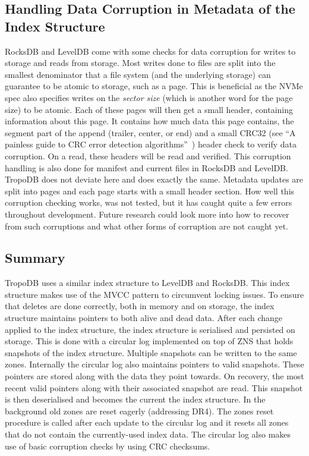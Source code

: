 \subsection{Handling Data Corruption in Metadata of the Index Structure}
RocksDB and LevelDB come with some checks for data corruption for writes to storage and reads from storage. Most writes done to files are split into the smallest denominator that a file system (and the underlying storage) can guarantee to be atomic to storage, such as a page. This is beneficial as the NVMe spec also specifies writes on the \textit{sector size} (which is another word for the page size) to be atomic. Each of these pages will then get a small header, containing information about this page. It contains how much data this page contains, the segment part of the append (trailer, center, or end) and a small CRC32 (see ``A painless guide to CRC error detection algorithms''~\cite{williams1993painless}) header check to verify data corruption. On a read, these headers will be read and verified. This corruption handling is also done for manifest and current files in RocksDB and LevelDB. TropoDB does not deviate here and does exactly the same. Metadata updates are split into pages and each page starts with a small header section. How well this corruption checking works, was not tested, but it has caught quite a few errors throughout development. Future research could look more into how to recover from such corruptions and what other forms of corruption are not caught yet.

\subsection{Summary}
TropoDB uses a similar index structure to LevelDB and RocksDB. This index structure makes use of the MVCC pattern to circumvent locking issues. To ensure that deletes are done correctly, both in memory and on storage, the index structure maintains pointers to both alive and dead data. After each change applied to the index structure, the index structure is serialised and persisted on storage. This is done with a circular log implemented on top of ZNS that holds snapshots of the index structure. Multiple snapshots can be written to the same zones. Internally the circular log also maintains pointers to valid snapshots. These pointers are stored along with the data they point towards. On recovery, the most recent valid pointers along with their associated snapshot are read. This snapshot is then deserialised and becomes the current the index structure. In the background old zones are reset eagerly (addressing DR4). The zones reset procedure is called after each update to the circular log and it resets all zones that do not contain the currently-used index data. The circular log also makes use of basic corruption checks by using CRC checksums. 

